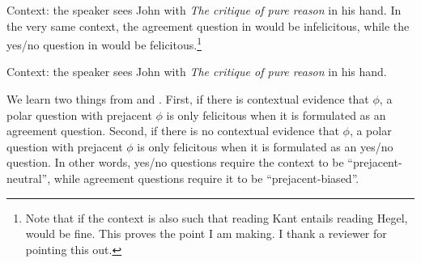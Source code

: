 \documentclass[output=paper,colorlinks,citecolor=brown]{langscibook}
\begin{document}
\ea\label{critique1}Context: the speaker sees John with \textit{The critique of pure reason} in his hand.
\label{kanta}
\label{cokantkhong2}
\z
\z
In the very same context, the agreement question in  would be infelicitous, while the yes/no question in  would be felicitous.\footnote{Note that if the context is also such that reading Kant entails reading Hegel,  would be fine. This proves the point I am making. I thank a reviewer for pointing this out.}

\ea
Context: the speaker sees John with \textit{The critique of pure reason} in his hand. \label{critique2}
\label{hegela}
 \label{cohegelkhong}
\z
\z


We learn two things from  and . First, if there is contextual evidence that $\phi$, a polar question with prejacent $\phi$ is only felicitous when it is formulated as an agreement question. Second, if there is no contextual evidence that $\phi$, a polar question with prejacent $\phi$ is only felicitous when it is formulated as an yes/no question. In other words, yes/no questions require the context to be ``prejacent-neutral'', while agreement questions require it to be ``prejacent-biased''. %
\end{document}
